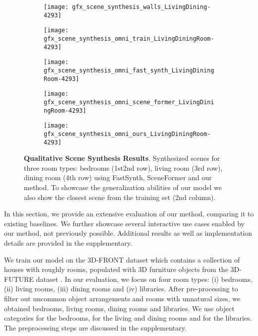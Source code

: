 \documentclass{article}
\newcommand{\boldparagraph}[1]{\vspace{0.2cm}\noindent{\bf #1:} }
\begin{document}
\begin{figure}
        \hfill \begin{subfigure}[b]{0.17\linewidth}
		\centering
		\texttt{[image: gfx\_scene\_synthesis\_walls\_LivingDining-4293]}
    \end{subfigure}\begin{subfigure}[b]{0.17\linewidth}
		\centering
		\texttt{[image: gfx\_scene\_synthesis\_omni\_train\_LivingDiningRoom-4293]}
    \end{subfigure}\begin{subfigure}[b]{0.17\linewidth}
		\centering
		\texttt{[image: gfx\_scene\_synthesis\_omni\_fast\_synth\_LivingDiningRoom-4293]}
    \end{subfigure}\begin{subfigure}[b]{0.17\linewidth}
		\centering
		\texttt{[image: gfx\_scene\_synthesis\_omni\_scene\_former\_LivingDiningRoom-4293]}
    \end{subfigure}\begin{subfigure}[b]{0.17\linewidth}
		\centering
		\texttt{[image: gfx\_scene\_synthesis\_omni\_ours\_LivingDiningRoom-4293]}
    \end{subfigure}\hfill \caption{\small {\bf Qualitative Scene Synthesis Results}. Synthesized scenes for three room types: bedrooms (1st2nd row), living room (3rd row), dining room (4th row) using FastSynth, SceneFormer and our method. To showcase the generalization abilities of our model we also show the closest scene from the training set (2nd column).}
    \label{fig:scene_synthesis_qualitative}
    \vspace{-1.2em}
\end{figure}


In this section, we provide an extensive evaluation of our method, comparing it to existing baselines. We further showcase several interactive use cases enabled by our method, not previously possible. Additional results as well as implementation details are provided in the supplementary.

\vspace{-2mm}
\boldparagraph{Datasets}We train our model on the 3D-FRONT dataset \cite{Fu2020ARXIVa} which contains a collection
of  houses with roughly  rooms,
populated with 3D furniture objects from the 3D-FUTURE dataset
\cite{Fu2020ARXIVb}. In our evaluation, we focus on four room types: (i) bedrooms,
(ii) living rooms, (iii) dining rooms and (iv) libraries. After
pre-processing to filter out uncommon object arrangements and rooms with
unnatural sizes, we obtained  bedrooms,  living rooms,
 dining rooms and  libraries. We use  object categories for the
bedrooms,  for the living and dining rooms and  for the
libraries. The preprocessing steps are discussed in the
supplementary. 
\end{document}
